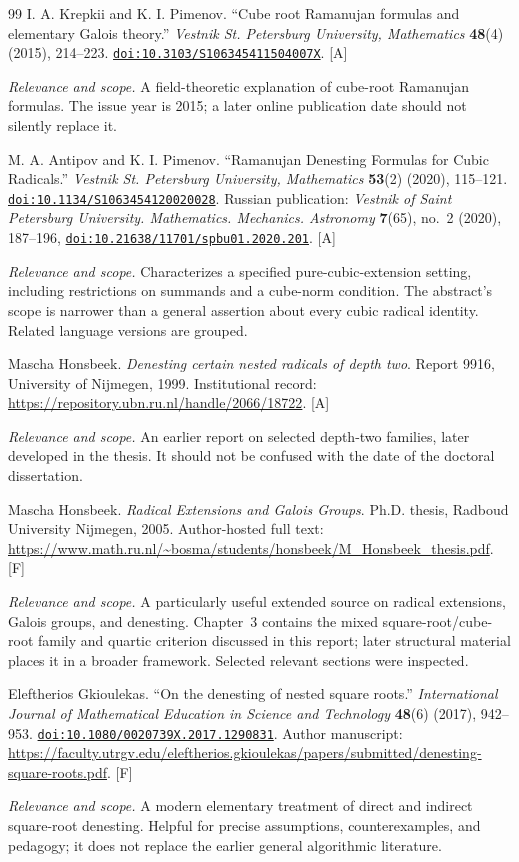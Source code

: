 \documentclass[11pt,oneside]{article}
\numberwithin{equation}{section}
\theoremstyle{definition}
\theoremstyle{remark}
\newcommand{\doi}[1]{\href{https://doi.org/#1}{\nolinkurl{doi:#1}}}
\newcommand{\status}[1]{\textsf{\small[#1]}}
\newcommand{\entrynote}[1]{\par\smallskip\noindent\emph{Relevance and scope.} #1}
\begin{document}
\begin{thebibliography}{99}
I. A. Krepkii and K. I. Pimenov. ``Cube root Ramanujan formulas and elementary Galois theory.'' \emph{Vestnik St. Petersburg University, Mathematics} \textbf{48}(4) (2015), 214--223. \doi{10.3103/S106345411504007X}. \status{A}
\entrynote{A field-theoretic explanation of cube-root Ramanujan formulas. The issue year is 2015; a later online publication date should not silently replace it.}

M. A. Antipov and K. I. Pimenov. ``Ramanujan Denesting Formulas for Cubic Radicals.'' \emph{Vestnik St. Petersburg University, Mathematics} \textbf{53}(2) (2020), 115--121. \doi{10.1134/S1063454120020028}. Russian publication: \emph{Vestnik of Saint Petersburg University. Mathematics. Mechanics. Astronomy} \textbf{7}(65), no.~2 (2020), 187--196, \doi{10.21638/11701/spbu01.2020.201}. \status{A}
\entrynote{Characterizes a specified pure-cubic-extension setting, including restrictions on summands and a cube-norm condition. The abstract's scope is narrower than a general assertion about every cubic radical identity. Related language versions are grouped.}

Mascha Honsbeek. \emph{Denesting certain nested radicals of depth two}. Report 9916, University of Nijmegen, 1999. Institutional record: \url{https://repository.ubn.ru.nl/handle/2066/18722}. \status{A}
\entrynote{An earlier report on selected depth-two families, later developed in the thesis. It should not be confused with the date of the doctoral dissertation.}

Mascha Honsbeek. \emph{Radical Extensions and Galois Groups}. Ph.D. thesis, Radboud University Nijmegen, 2005. Author-hosted full text: \url{https://www.math.ru.nl/~bosma/students/honsbeek/M_Honsbeek_thesis.pdf}. \status{F}
\entrynote{A particularly useful extended source on radical extensions, Galois groups, and denesting. Chapter~3 contains the mixed square-root/cube-root family and quartic criterion discussed in this report; later structural material places it in a broader framework. Selected relevant sections were inspected.}

Eleftherios Gkioulekas. ``On the denesting of nested square roots.'' \emph{International Journal of Mathematical Education in Science and Technology} \textbf{48}(6) (2017), 942--953. \doi{10.1080/0020739X.2017.1290831}. Author manuscript: \url{https://faculty.utrgv.edu/eleftherios.gkioulekas/papers/submitted/denesting-square-roots.pdf}. \status{F}
\entrynote{A modern elementary treatment of direct and indirect square-root denesting. Helpful for precise assumptions, counterexamples, and pedagogy; it does not replace the earlier general algorithmic literature.}


\end{thebibliography}
\end{document}

